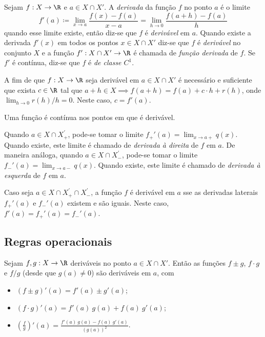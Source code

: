 \documentclass{article}
\begin{document}
\begin{defn}
    Sejam \(f: X \to \R\) e \(a \in X \cap X'\). A \emph{derivada} da função \(f\) no ponto \(a\) é o limite
    \begin{equation}
        f'(a) \coloneq \lim_{x \to a} \frac{f(x) - f(a)}{x - a} = \lim_{h \to 0} \frac{f(a + h) - f(a)}{h}
    \end{equation}
    \noindent quando esse limite existe, então diz-se que \(f\) é \emph{derivável} em \(a\). Quando existe a derivada \(f'(x)\) em todos os pontos \(x \in X \cap X'\) diz-se que \(f\) é \emph{derivável} no conjunto \(X\) e a função \(f': X \cap X' \to \R\) é chamada de \emph{função derivada} de \(f\). Se \(f'\) é contínua, diz-se que \(f\) é \emph{de classe \(C^1\)}.
\end{defn}

\begin{prop}
    A fim de que \(f: X \to \R\) seja derivável em \(a \in X \cap X'\) é necessário e suficiente que exista \(c \in \R\) tal que \(a+h \in X \implies f(a+h) = f(a) + c \cdot h + r(h)\), onde \(\lim_{h \to 0} r(h)/h = 0\). Neste caso, \(c = f'(a)\).
\end{prop}

\begin{cor}
    Uma função é contínua nos pontos em que é derivável.
\end{cor}

\begin{defn} 
    Quando \(a \in X \cap X_{+}^{'}\), pode-se tomar o limite \(f_{+}'(a) = \lim_{x \to a+} q(x)\). Quando existe, este limite é chamado de \emph{derivada à direita} de \(f\) em \(a\). De maneira análoga, quando \(a \in X \cap X_{-}^{'}\), pode-se tomar o limite \(f_{-}'(a) = \lim_{x \to a-} q(x)\). Quando existe, este limite é chamado de \emph{derivada à esquerda} de \(f\) em \(a\).

    Caso seja \(a \in X \cap X_{+}^{'} \cap X_{-}^{'}\), a função \(f\) é derivável em \(a\) sse as derivadas laterais \(f_{+}'(a)\) e \(f_{-}'(a)\) existem e são iguais. Neste caso, \(f'(a) = f_{+}'(a) = f_{-}'(a)\).
\end{defn}

\subsection{Regras operacionais}

\begin{thm}
    Sejam \(f, g: X \to \R\) deriváveis no ponto \(a \in X \cap X'\). Então as funções \(f \pm g\), \(f \cdot g\) e \(f / g\) (desde que \(g(a) \neq 0\)) são deriváveis em \(a\), com
    \begin{itemize}
        \item [(i)] \((f \pm g)'(a) = f'(a) \pm g'(a)\);
        \item [(ii)] \((f \cdot g)'(a) = f'(a)\ g(a) + f(a)\ g'(a)\);
        \item [(iii)] \(\displaystyle\left(\frac{f}{g}\right)'(a) = \frac{f'(a)\ g(a) - f(a)\ g'(a)}{(g(a))^2}\).
    \end{itemize}
\end{thm}
\end{document}
